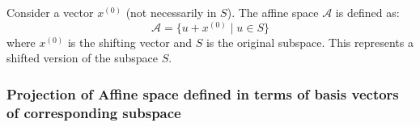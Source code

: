        \begin{example}
            Consider a vector $x^{(0)}$ (not necessarily in $S$). The affine space $\mathcal{A}$ is defined as:
            \[
            \mathcal{A} = \{ u + x^{(0)} \mid u \in S \}
            \]
            where $x^{(0)}$ is the shifting vector and $S$ is the original subspace. This represents a shifted version of the subspace $S$.

        \end{example}

        \subsubsection{Projection of Affine space defined in terms of basis vectors of corresponding subspace}
